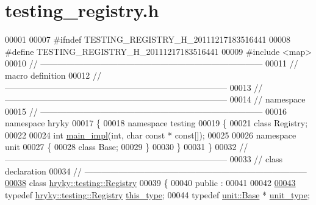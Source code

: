 \hypertarget{testing__registry_8h_source}{\section{testing\-\_\-registry.\-h}
}

\begin{DoxyCode}
00001 
00007 \textcolor{preprocessor}{#ifndef TESTING\_REGISTRY\_H\_20111217183516441}
00008 \textcolor{preprocessor}{}\textcolor{preprocessor}{#define TESTING\_REGISTRY\_H\_20111217183516441}
00009 \textcolor{preprocessor}{}\textcolor{preprocessor}{#include <map>}
00010 \textcolor{comment}{//
      ------------------------------------------------------------------------------}
00011 \textcolor{comment}{// macro definition}
00012 \textcolor{comment}{//
      ------------------------------------------------------------------------------}
00013 \textcolor{comment}{//
      ------------------------------------------------------------------------------}
00014 \textcolor{comment}{// namespace}
00015 \textcolor{comment}{//
      ------------------------------------------------------------------------------}
00016 \textcolor{keyword}{namespace }hryky
00017 \{
00018 \textcolor{keyword}{namespace }testing
00019 \{
00021     \textcolor{keyword}{class }Registry;
00022 
00024     \textcolor{keywordtype}{int} \hyperlink{namespacehryky_1_1testing_a3f6a3cf63bf23525fe1e462fd3b83474}{main_impl}(\textcolor{keywordtype}{int}, \textcolor{keywordtype}{char} \textcolor{keyword}{const} * \textcolor{keyword}{const}[]);
00025 
00026 \textcolor{keyword}{namespace }unit
00027 \{
00028     \textcolor{keyword}{class }Base;
00029 \}
00030 \}
00031 \}
00032 \textcolor{comment}{//
      ------------------------------------------------------------------------------}
00033 \textcolor{comment}{// class declaration}
00034 \textcolor{comment}{//
      ------------------------------------------------------------------------------}
\hypertarget{testing__registry_8h_source_l00038}{}\hyperlink{classhryky_1_1testing_1_1_registry}{00038} \textcolor{comment}{}\textcolor{keyword}{class }\hyperlink{classhryky_1_1testing_1_1_registry}{hryky::testing::Registry}
00039 \{
00040 \textcolor{keyword}{public} :
00041 
00042     
\hypertarget{testing__registry_8h_source_l00043}{}\hyperlink{classhryky_1_1testing_1_1_registry_ab12764189072e5208e8919e31ab49aac}{00043}     \textcolor{keyword}{typedef} \hyperlink{classhryky_1_1testing_1_1_registry}{hryky::testing::Registry}                \hyperlink{classhryky_1_1testing_1_1_registry_ab12764189072e5208e8919e31ab49aac}{this_type};
00044     \textcolor{keyword}{typedef} \hyperlink{classhryky_1_1testing_1_1unit_1_1_base}{unit::Base} *                            \hyperlink{classhryky_1_1testing_1_1unit_1_1_base}{unit_type};

\end{DoxyCode}
